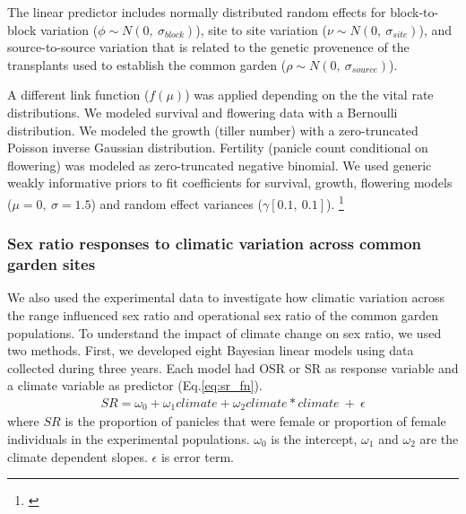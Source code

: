 \documentclass[12pt]{article}\usepackage[]{graphicx}\usepackage[dvipsnames]{xcolor}
\newcommand{\tom}[2]{{\color{red}{#1}}\footnote{\textit{\color{red}{#2}}}}
\begin{document}
The linear predictor includes normally distributed random effects for block-to-block variation ($\phi \sim N(0,\ \sigma_{block})$), site to site variation ($\nu \sim N(0,\ \sigma_{site})$), and source-to-source variation that is related to the genetic provenence of the transplants used to establish the common garden ($\rho \sim N(0,\ \sigma_{source})$).

A different link function ($f(\mu)$) was applied depending on the the vital rate distributions. 
We modeled survival and flowering data with a Bernoulli distribution.
We modeled the growth (tiller number) with a zero-truncated Poisson inverse Gaussian distribution. 
Fertility (panicle count conditional on flowering) was modeled as zero-truncated negative binomial. 
We used generic weakly informative priors to fit coefficients for survival, growth, flowering models ($\mu = 0,\ \sigma = 1.5$) and random effect variances ($\gamma [0.1,\ 0.1]$).
\tom{We fit fertility model with regularizing priors for coefficients ($\mu = 0,\ \sigma = 0.15$).}{I think you need to explain a little more about why fertility was handled differently and what you mean by regularizing.}

\subsubsection*{Sex ratio responses to climatic variation across common garden sites}
We also used the experimental data to investigate how climatic variation across the range influenced sex ratio and operational sex ratio of the common garden populations. 
To understand the impact of climate change on sex ratio, we used two methods. 
First, we developed eight Bayesian linear models using  data collected during three years.
Each model had OSR or SR as response variable and a climate variable as predictor (Eq.\ref{eq:sr_fn}). 
\begin{align}\label{eq:sr_fn}
	SR = \omega_{0}+ \omega_{1}climate + \omega_{2}climate*climate\  + \  \epsilon
\end{align}
\noindent where $SR$ is the proportion of panicles that were female or proportion of female individuals in the experimental populations.
$\omega_{0}$ is the intercept, $\omega_{1}$ and $\omega_{2}$ are the climate dependent slopes.
$\epsilon$ is error term.
\end{document}
